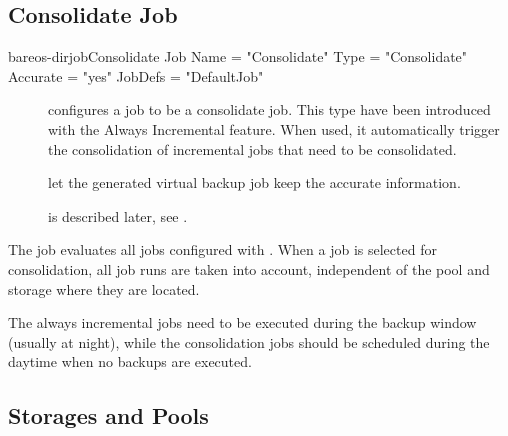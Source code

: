 \subsection{Consolidate Job}

\begin{bareosConfigResource}{bareos-dir}{job}{Consolidate}
Job {
    Name = "Consolidate"
    Type = "Consolidate"
    Accurate = "yes"
    JobDefs = "DefaultJob"
}
\end{bareosConfigResource}

\begin{description}
    \item[] configures a job to be a consolidate job. This type have been introduced with the Always Incremental feature. When used, it automatically trigger the consolidation of incremental jobs that need to be consolidated.
    \item[] let the generated virtual backup job keep the accurate information.
    \item[] is described later, see .
\end{description}

The  job evaluates all jobs configured with . When a job is selected for consolidation, all job runs are taken into account, independent of the pool and storage where they are located.

The always incremental jobs need to be executed during the backup window (usually at night), while the consolidation jobs should be scheduled during the daytime when no backups are executed.



\subsection{Storages and Pools}

